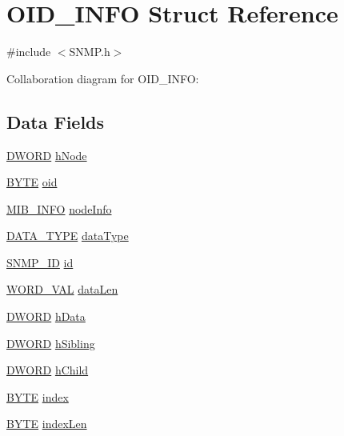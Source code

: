 \hypertarget{struct_o_i_d___i_n_f_o}{}\section{O\+I\+D\+\_\+\+I\+N\+F\+O Struct Reference}
\label{struct_o_i_d___i_n_f_o}


{\ttfamily \#include $<$S\+N\+M\+P.\+h$>$}



Collaboration diagram for O\+I\+D\+\_\+\+I\+N\+F\+O\+:
\subsection*{Data Fields}
\begin{DoxyCompactItemize}
\item 
\hyperlink{_generic_type_defs_8h_ad342ac907eb044443153a22f964bf0af}{D\+W\+O\+R\+D} \hyperlink{struct_o_i_d___i_n_f_o_af6c789b02c43ea9f3255241310fb71a4}{h\+Node}
\item 
\hyperlink{_generic_type_defs_8h_a4ae1dab0fb4b072a66584546209e7d58}{B\+Y\+T\+E} \hyperlink{struct_o_i_d___i_n_f_o_a24d9e34929c64d383e961e67f511ab4a}{oid}
\item 
\hyperlink{union_m_i_b___i_n_f_o}{M\+I\+B\+\_\+\+I\+N\+F\+O} \hyperlink{struct_o_i_d___i_n_f_o_a68384b5cf7ff8ca6b15742deeb84f3a1}{node\+Info}
\item 
\hyperlink{_s_n_m_p_8h_aa082c000e4eff6ed512714ea0a33d27b}{D\+A\+T\+A\+\_\+\+T\+Y\+P\+E} \hyperlink{struct_o_i_d___i_n_f_o_ae1b220d8614bfb5825696adc4c734b58}{data\+Type}
\item 
\hyperlink{_s_n_m_p_8h_a97d5c4fe402fba9b220e62d9f361276a}{S\+N\+M\+P\+\_\+\+I\+D} \hyperlink{struct_o_i_d___i_n_f_o_a8486be484406a49c3b64f18f30fa8ec9}{id}
\item 
\hyperlink{union_w_o_r_d___v_a_l}{W\+O\+R\+D\+\_\+\+V\+A\+L} \hyperlink{struct_o_i_d___i_n_f_o_ac4700c4e42e3f114d284e054f73bab3d}{data\+Len}
\item 
\hyperlink{_generic_type_defs_8h_ad342ac907eb044443153a22f964bf0af}{D\+W\+O\+R\+D} \hyperlink{struct_o_i_d___i_n_f_o_a2228c704f8518cecf2198bbf9156f540}{h\+Data}
\item 
\hyperlink{_generic_type_defs_8h_ad342ac907eb044443153a22f964bf0af}{D\+W\+O\+R\+D} \hyperlink{struct_o_i_d___i_n_f_o_a6cb93f3da505c49db9cccba587fd54b6}{h\+Sibling}
\item 
\hyperlink{_generic_type_defs_8h_ad342ac907eb044443153a22f964bf0af}{D\+W\+O\+R\+D} \hyperlink{struct_o_i_d___i_n_f_o_a041fb72fa2d7415a4069d40644f6c0d9}{h\+Child}
\item 
\hyperlink{_generic_type_defs_8h_a4ae1dab0fb4b072a66584546209e7d58}{B\+Y\+T\+E} \hyperlink{struct_o_i_d___i_n_f_o_a3e47fb8bc59d325b33374d8f2ab1997d}{index}
\item 
\hyperlink{_generic_type_defs_8h_a4ae1dab0fb4b072a66584546209e7d58}{B\+Y\+T\+E} \hyperlink{struct_o_i_d___i_n_f_o_a3f5785d3d48f99dacd45015c394e44cc}{index\+Len}
\end{DoxyCompactItemize}


